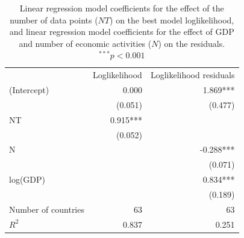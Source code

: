 \begin{table}[ht]
\centering
\begin{tabular}{lrr}
\toprule
                    & \multicolumn{1}{c}{Loglikelihood} & \multicolumn{1}{c}{Loglikelihood residuals} \\ 
\cmidrule(lr){2-2} \cmidrule(lr){3-3} 
(Intercept)         &                             0.000 &                                    1.869*** \\ 
                    &                           (0.051) &                                     (0.477) \\ 
NT                  &                          0.915*** &                                             \\ 
                    &                           (0.052) &                                             \\ 
N                   &                                   &                                   -0.288*** \\ 
                    &                                   &                                     (0.071) \\ 
log(GDP)             &                                   &                                    0.834*** \\ 
                    &                                   &                                     (0.189) \\ 
\midrule
Number of countries &                                63 &                                          63 \\ 
$R^2$               &                             0.837 &                                       0.251 \\ 
\bottomrule
\end{tabular}
\caption{Linear regression model coefficients for the effect of the number of data points ($NT$) on the best model loglikelihood, and linear regression model coefficients for the effect of GDP and number of economic activities ($N$) on the residuals. $^{***} p < 0.001$}\label{table:gdp_loglikelihood}
\end{table}
